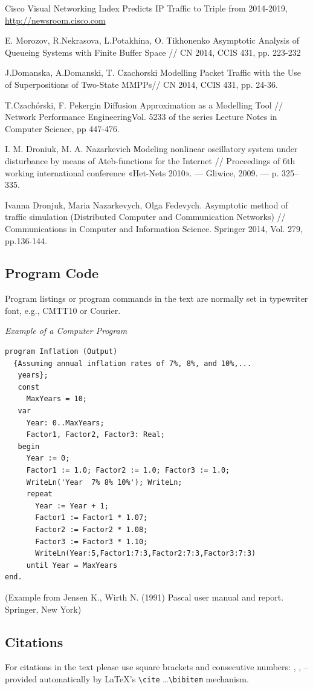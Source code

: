 \documentclass[runningheads,a4paper]{llncs}
\begin{document}
\begin{thebibliography}{4}

 Cisco Visual Networking Index Predicts IP Traffic to Triple from 2014-2019, \url{http://newsroom.cisco.com}

 E. Morozov, R.Nekrasova, L.Potakhina, O. Tikhonenko Asymptotic Analysis of Queueing Systems with Finite Buffer Space // CN 2014, CCIS 431, pp. 223-232

 J.Domanska, A.Domanski, T. Czachorski Modelling Packet Traffic with the Use of Superpositions of Two-State MMPPs// CN 2014, CCIS 431, pp. 24-36.

 T.Czachórski, F. Pekergin Diffusion Approximation as a Modelling Tool // Network Performance EngineeringVol. 5233 of the series Lecture Notes in Computer Science, pp 447-476.

 I. M. Droniuk, M. A. Nazarkevich Мodeling nonlinear oscillatory system under disturbance by means of Ateb-functions for the Internet  // Proceedings of 6th working international conference «Het-Nets 2010». — Gliwice, 2009. — p. 325–335.

 Ivanna Dronjuk, Maria Nazarkevych, Olga Fedevych. Asymptotic method of traffic simulation (Distributed Computer and Communication Networks) // Communications in Computer and Information Science. Springer 2014, Vol. 279, pp.136-144.

\end{thebibliography}



\subsection{Program Code}

Program listings or program commands in the text are normally set in
typewriter font, e.g., CMTT10 or Courier.

\medskip

\noindent
{\it Example of a Computer Program}
\begin{verbatim}
program Inflation (Output)
  {Assuming annual inflation rates of 7%, 8%, and 10%,...
   years};
   const
     MaxYears = 10;
   var
     Year: 0..MaxYears;
     Factor1, Factor2, Factor3: Real;
   begin
     Year := 0;
     Factor1 := 1.0; Factor2 := 1.0; Factor3 := 1.0;
     WriteLn('Year  7% 8% 10%'); WriteLn;
     repeat
       Year := Year + 1;
       Factor1 := Factor1 * 1.07;
       Factor2 := Factor2 * 1.08;
       Factor3 := Factor3 * 1.10;
       WriteLn(Year:5,Factor1:7:3,Factor2:7:3,Factor3:7:3)
     until Year = MaxYears
end.
\end{verbatim}
%
\noindent
{\small (Example from Jensen K., Wirth N. (1991) Pascal user manual and
report. Springer, New York)}

\subsection{Citations}

For citations in the text please use
square brackets and consecutive numbers: \cite{jour}, \cite{lncschap},
\cite{proceeding1} -- provided automatically
by \LaTeX 's \verb|\cite| \dots\verb|\bibitem| mechanism.
\end{document}
